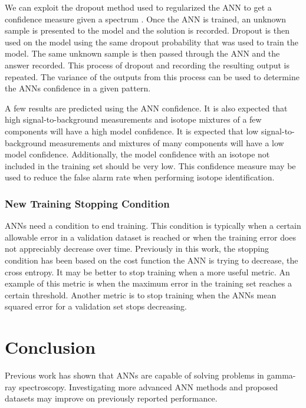 \documentclass[tocnosub,noragright,centerchapter,12pt,fullpage]{uiucecethesis09}
\begin{document}
We can exploit the dropout method used to regularized the ANN to get a confidence measure given a spectrum \cite{Yarin2016}. Once the ANN is trained, an unknown sample is presented to the model and the solution is recorded. Dropout is then used on the model using the same dropout probability that was used to train the model. The same unknown sample is then passed through the ANN and the answer recorded. This process of dropout and recording the resulting output is repeated. The variance of the outputs from this process can be used to determine the ANNs confidence in a given pattern. 

A few results are predicted using the ANN confidence. It is also expected that high signal-to-background measurements and isotope mixtures of a few components will have a high model confidence. It is expected that low signal-to-background measurements and mixtures of many components will have a low model confidence. Additionally, the model confidence with an isotope not included in the training set should be very low. This confidence measure may be used to reduce the false alarm rate when performing isotope identification. 

\subsection{New Training Stopping Condition}

ANNs need a condition to end training. This condition is typically when a certain allowable error in a validation dataset is reached or when the training error does not appreciably decrease over time. Previously in this work, the stopping condition has been based on the cost function the ANN is trying to decrease, the cross entropy. It may be better to stop training when a more useful metric. An example of this metric is when the maximum error in the training set reaches a certain threshold. Another metric is to stop training when the ANNs mean squared error for a validation set stops decreasing.



\chapter{Conclusion}

Previous work has shown that ANNs are capable of solving problems in gamma-ray spectroscopy. Investigating more advanced ANN methods and proposed datasets may improve on previously reported performance.








\end{document}
